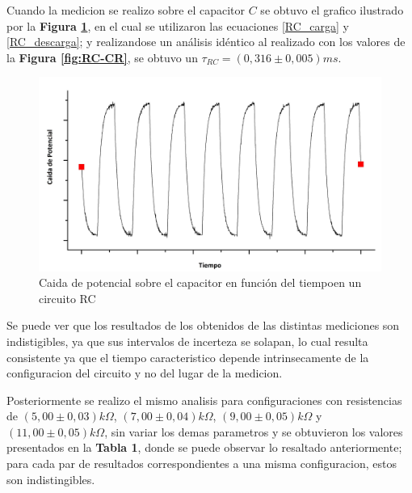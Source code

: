 \documentclass[11pt,a4paper]{article}
\begin{document}
Cuando la medicion se realizo sobre el capacitor $C$ se obtuvo el grafico ilustrado por la \textbf{Figura \ref{fig:RC-CC}}, en el cual se utilizaron las ecuaciones \eqref{RC_carga} y \eqref{RC_descarga}; y realizandose un análisis idéntico al realizado con los valores de la \textbf{Figura \ref{fig:RC-CR}}, se obtuvo un $\tau_{RC}=(0,316 \pm 0,005) ms$.

\begin{figure}[H]
\centering
\includegraphics[scale=0.45]{RC-Caida_en_Capacitor}
  \caption{Caida de potencial sobre el capacitor en función del tiempoen un circuito RC}
  \label{fig:RC-CC}
\end{figure}

Se puede ver que los resultados de los obtenidos de las distintas mediciones son indistigibles, ya que sus intervalos de incerteza se solapan, lo cual resulta consistente ya que el tiempo caracteristico depende intrinsecamente de la configuracion del circuito y no del lugar de la medicion.

Posteriormente se realizo el mismo analisis para configuraciones con resistencias de $(5,00\pm0,03)k\Omega$, $(7,00\pm0,04)k\Omega$, $(9,00\pm0,05)k\Omega$ y $(11,00\pm0,05)k\Omega$, sin variar los demas parametros y se obtuvieron los valores presentados en la \textbf{Tabla 1}, donde se puede observar lo resaltado anteriormente; para cada par de resultados correspondientes a una misma configuracion, estos son indistingibles.\\ 
\end{document}

